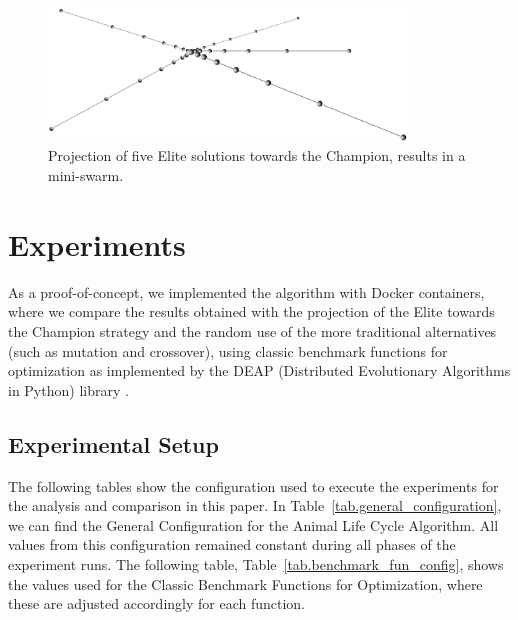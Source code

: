 \documentclass[graybox]{svmult}
\begin{document}
        \begin{figure}
            \centering
            \includegraphics[width=0.85\textwidth]{img/fig_elite_projection_swarm.pdf}
            \caption{Projection of five Elite solutions towards the Champion, results in a mini-swarm.} \label{fig.elite_projection_swarm}
            \end{figure}
        
        \FloatBarrier

\section{Experiments}
    \label{section.experiments}

    As a proof-of-concept, we implemented the algorithm with Docker containers,
    where we compare the results obtained with the projection of the Elite towards
    the Champion strategy and the random use of the more traditional alternatives
    (such as mutation and crossover), using classic benchmark functions for
    optimization as implemented by the DEAP (Distributed Evolutionary Algorithms in
    Python) library \cite{fortin2012deap}.

    \subsection{Experimental Setup} 

        The following tables show the configuration used to execute the experiments for
        the analysis and comparison in this paper. In
        Table~\ref{tab.general_configuration}, we can find the General Configuration
        for the Animal Life Cycle Algorithm. All values from this configuration
        remained constant during all phases of the experiment runs. The following
        table, Table~\ref{tab.benchmark_fun_config}, shows the values used for the
        Classic Benchmark Functions for Optimization, where these are adjusted
        accordingly for each function.
\end{document}
